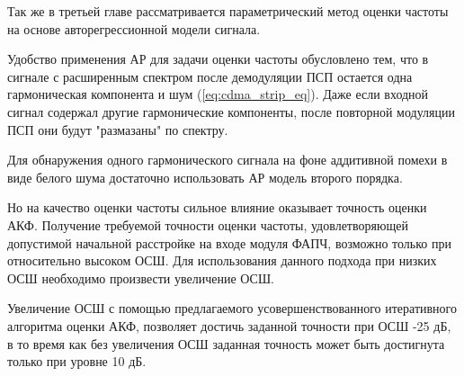 Так же в третьей главе рассматривается параметрический метод оценки частоты на основе авторегрессионной модели сигнала.

Удобство применения АР для задачи оценки частоты обусловлено тем, что в сигнале с расширенным спектром после демодуляции ПСП остается одна
гармоническая компонента и шум (\ref{eq:cdma_strip_eq}).  Даже если входной сигнал содержал другие гармонические компоненты,
после повторной модуляции ПСП они будут "размазаны" по спектру.

Для обнаружения одного гармонического сигнала на фоне аддитивной помехи в виде белого шума достаточно использовать АР модель второго порядка.

Но на качество оценки частоты сильное влияние оказывает точность оценки АКФ. Получение требуемой точности оценки частоты, удовлетворяющей допустимой начальной
расстройке на входе модуля ФАПЧ, возможно только при относительно высоком ОСШ. Для использования данного подхода при низких ОСШ необходимо произвести
увеличение ОСШ.

Увеличение ОСШ с помощью предлагаемого усовершенствованного итеративного алгоритма оценки АКФ, позволяет достичь заданной точности при ОСШ -25 дБ, в то
время как без увеличения ОСШ заданная точность может быть достигнута только при уровне 10 дБ.

